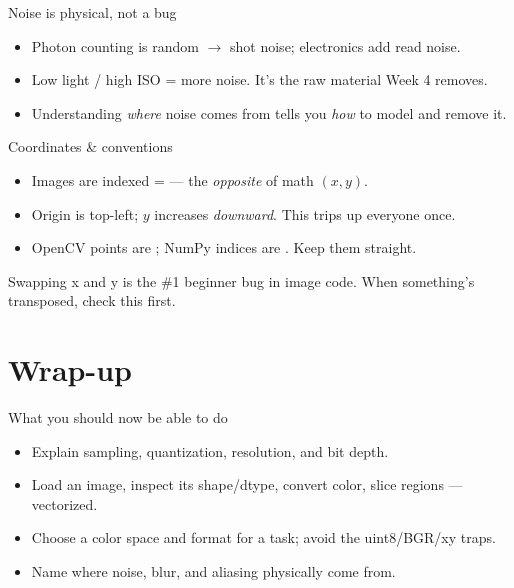 \documentclass[10pt,aspectratio=169]{beamer}
\begin{document}
\begin{frame}{Noise is physical, not a bug}
  \begin{itemize}
    \item Photon counting is random $\rightarrow$ shot noise; electronics add read noise.
    \item Low light / high ISO = more noise. It's the raw material Week 4 removes.
    \item Understanding \emph{where} noise comes from tells you \emph{how} to model and remove it.
  \end{itemize}
\end{frame}

\begin{frame}{Coordinates \& conventions}
  \begin{itemize}
    \item Images are indexed  = \code{[y, x]} — the \emph{opposite} of math $(x,y)$.
    \item Origin is top-left; $y$ increases \emph{downward}. This trips up everyone once.
    \item OpenCV points are ; NumPy indices are \code{[y, x]}. Keep them straight.
  \end{itemize}
  \begin{badbox}
    Swapping x and y is the \#1 beginner bug in image code. When something's transposed, check this first.
  \end{badbox}
\end{frame}

\section{Wrap-up}

\begin{frame}{What you should now be able to do}
  \begin{itemize}
    \item Explain sampling, quantization, resolution, and bit depth.
    \item Load an image, inspect its shape/dtype, convert color, slice regions — vectorized.
    \item Choose a color space and format for a task; avoid the uint8/BGR/xy traps.
    \item Name where noise, blur, and aliasing physically come from.
  \end{itemize}
\end{frame}
\end{document}
